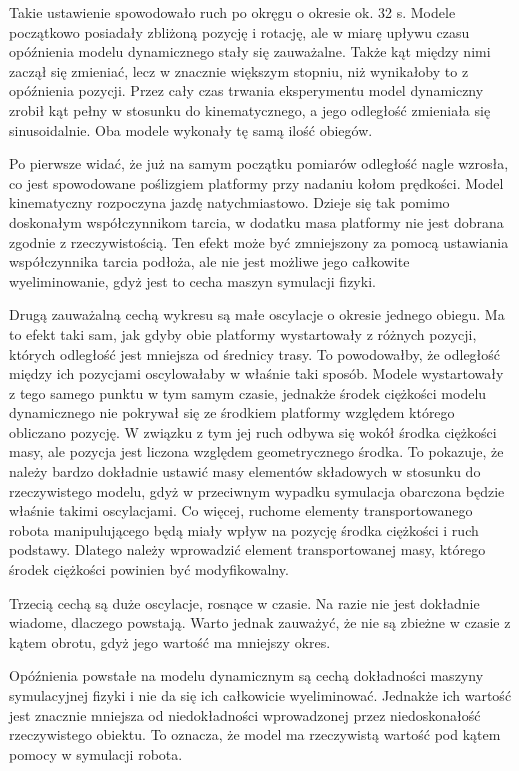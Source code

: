 Takie ustawienie spowodowało ruch po okręgu o okresie ok. 32 s.
Modele początkowo posiadały zbliżoną pozycję i rotację, ale w miarę upływu czasu opóźnienia modelu dynamicznego stały się zauważalne.
Także kąt między nimi zaczął się zmieniać, lecz w znacznie większym stopniu, niż wynikałoby to z opóźnienia pozycji.
Przez cały czas trwania eksperymentu model dynamiczny zrobił kąt pełny w stosunku do kinematycznego, a jego odległość zmieniała się sinusoidalnie.
Oba modele wykonały tę samą ilość obiegów.

Po pierwsze widać, że już na samym początku pomiarów odległość nagle wzrosła, co jest spowodowane poślizgiem platformy przy nadaniu kołom prędkości.
Model kinematyczny rozpoczyna jazdę natychmiastowo.
Dzieje się tak pomimo doskonałym współczynnikom tarcia, w dodatku masa platformy nie jest dobrana zgodnie z rzeczywistością.
Ten efekt może być zmniejszony za pomocą ustawiania współczynnika tarcia podłoża, ale nie jest możliwe jego całkowite wyeliminowanie, gdyż jest to cecha maszyn symulacji fizyki.

Drugą zauważalną cechą wykresu są małe oscylacje o okresie jednego obiegu.
Ma to efekt taki sam, jak gdyby obie platformy wystartowały z różnych pozycji, których odległość jest mniejsza od średnicy trasy.
To powodowałby, że odległość między ich pozycjami oscylowałaby w właśnie taki sposób.
Modele wystartowały z tego samego punktu w tym samym czasie, jednakże środek ciężkości modelu dynamicznego nie pokrywał się ze środkiem platformy względem którego obliczano pozycję.
W związku z tym jej ruch odbywa się wokół środka ciężkości masy, ale pozycja jest liczona względem geometrycznego środka.
To pokazuje, że należy bardzo dokładnie ustawić masy elementów składowych w stosunku do rzeczywistego modelu, gdyż w przeciwnym wypadku symulacja obarczona będzie właśnie takimi oscylacjami.
Co więcej, ruchome elementy transportowanego robota manipulującego będą miały wpływ na pozycję środka ciężkości i ruch podstawy.
Dlatego należy wprowadzić element transportowanej masy, którego środek ciężkości powinien być modyfikowalny.

Trzecią cechą są duże oscylacje, rosnące w czasie.
Na razie nie jest dokładnie wiadome, dlaczego powstają.
Warto jednak zauważyć, że nie są zbieżne w czasie z kątem obrotu, gdyż jego wartość ma mniejszy okres.

Opóźnienia powstałe na modelu dynamicznym są cechą dokładności maszyny symulacyjnej fizyki i nie da się ich całkowicie wyeliminować.
Jednakże ich wartość jest znacznie mniejsza od niedokładności wprowadzonej przez niedoskonałość rzeczywistego obiektu.
To oznacza, że model ma rzeczywistą wartość pod kątem pomocy w symulacji robota.

